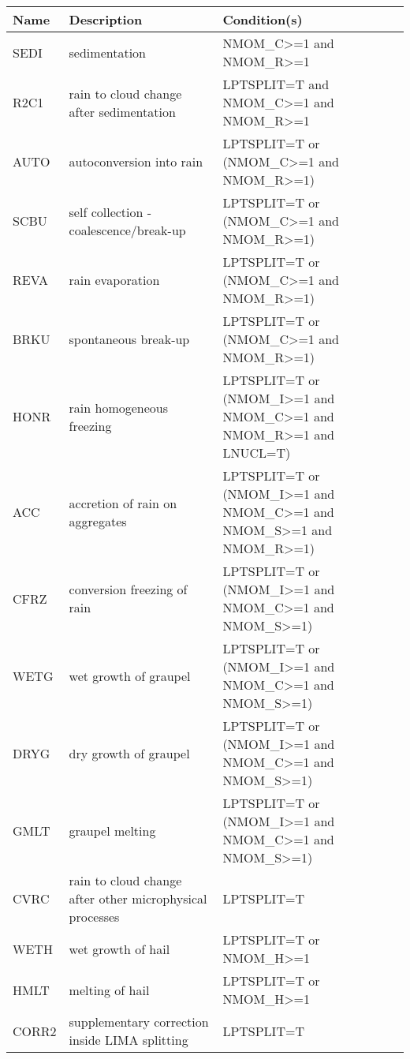 \begin{longtable} {|p{}|p{}|p{}|}
\hline
Name & Description & Condition(s) \\
\hline \hline
SEDI   & sedimentation                                            & NMOM\_C>=1 and NMOM\_R>=1 \\\hline
R2C1   & rain to cloud change after sedimentation                 & LPTSPLIT=T and NMOM\_C>=1 and NMOM\_R>=1 \\\hline
AUTO   & autoconversion into rain                                 & LPTSPLIT=T or (NMOM\_C>=1 and NMOM\_R>=1) \\\hline
SCBU   & self collection - coalescence/break-up                   & LPTSPLIT=T or (NMOM\_C>=1 and NMOM\_R>=1) \\\hline
REVA   & rain evaporation                                         & LPTSPLIT=T or (NMOM\_C>=1 and NMOM\_R>=1) \\\hline
BRKU   & spontaneous break-up                                     & LPTSPLIT=T or (NMOM\_C>=1 and NMOM\_R>=1)        \\\hline
HONR   & rain homogeneous freezing                                & LPTSPLIT=T or (NMOM\_I>=1 and NMOM\_C>=1 and NMOM\_R>=1 and LNUCL=T) \\\hline
ACC    & accretion of rain on aggregates                          & LPTSPLIT=T or (NMOM\_I>=1 and NMOM\_C>=1 and NMOM\_S>=1 and NMOM\_R>=1) \\\hline
CFRZ   & conversion freezing of rain                              & LPTSPLIT=T or (NMOM\_I>=1 and NMOM\_C>=1 and NMOM\_S>=1) \\\hline
WETG   & wet growth of graupel                                    & LPTSPLIT=T or (NMOM\_I>=1 and NMOM\_C>=1 and NMOM\_S>=1) \\\hline
DRYG   & dry growth of graupel                                    & LPTSPLIT=T or (NMOM\_I>=1 and NMOM\_C>=1 and NMOM\_S>=1) \\\hline
GMLT   & graupel melting                                          & LPTSPLIT=T or (NMOM\_I>=1 and NMOM\_C>=1 and NMOM\_S>=1) \\\hline
CVRC   & rain to cloud change after other microphysical processes & LPTSPLIT=T \\\hline
WETH   & wet growth of hail                                       & LPTSPLIT=T or NMOM\_H>=1 \\\hline
HMLT   & melting of hail                                          & LPTSPLIT=T or NMOM\_H>=1 \\\hline
CORR2  & supplementary correction inside LIMA splitting           & LPTSPLIT=T \\\hline
\endhead
\end{longtable}

